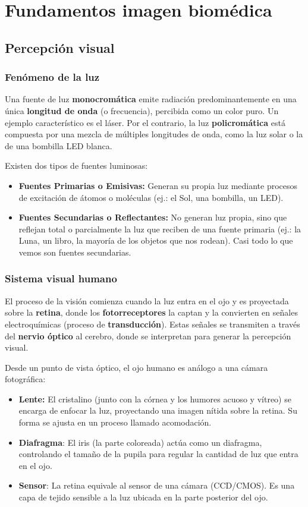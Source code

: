 \chapter{Fundamentos imagen biomédica}
\section{Percepción visual}
\subsection{Fenómeno de la luz}
Una fuente de luz \textbf{monocromática} emite radiación predominantemente en una única \textbf{longitud de onda} (o frecuencia), percibida como un color puro. Un ejemplo característico es el láser. Por el contrario, la luz \textbf{policromática} está compuesta por una mezcla de múltiples longitudes de onda, como la luz solar o la de una bombilla LED blanca.

Existen dos tipos de fuentes luminosas:
\begin{itemize}
\item \textbf{Fuentes Primarias o Emisivas:} Generan su propia luz mediante procesos de excitación de átomos o moléculas (ej.: el Sol, una bombilla, un LED).
\item \textbf{Fuentes Secundarias o Reflectantes:} No generan luz propia, sino que reflejan total o parcialmente la luz que reciben de una fuente primaria (ej.: la Luna, un libro, la mayoría de los objetos que nos rodean). Casi todo lo que vemos son fuentes secundarias.
\end{itemize}

\subsection{Sistema visual humano}
El proceso de la visión comienza cuando la luz entra en el ojo y es proyectada sobre la \textbf{retina}, donde los \textbf{fotorreceptores} la captan y la convierten en señales electroquímicas (proceso de \textbf{transducción}). Estas señales se transmiten a través del \textbf{nervio óptico} al cerebro, donde se interpretan para generar la percepción visual.

Desde un punto de vista óptico, el ojo humano es análogo a una cámara fotográfica:
\begin{itemize}
\item \textbf{Lente:} El cristalino (junto con la córnea y los humores acuoso y vítreo) se encarga de enfocar la luz, proyectando una imagen nítida sobre la retina. Su forma se ajusta en un proceso llamado acomodación.
\item \textbf{Diafragma}: El iris (la parte coloreada) actúa como un diafragma, controlando el tamaño de la pupila para regular la cantidad de luz que entra en el ojo.
\item \textbf{Sensor}: La retina equivale al sensor de una cámara (CCD/CMOS). Es una capa de tejido sensible a la luz ubicada en la parte posterior del ojo.
\end{itemize}

